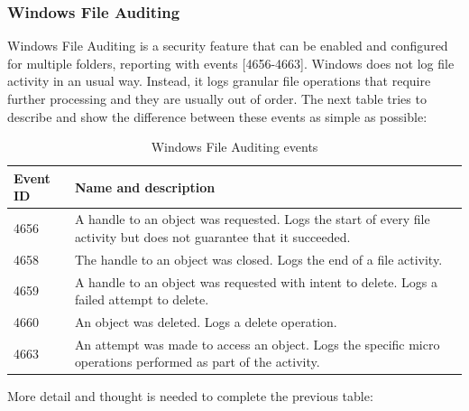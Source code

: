 \subsubsection{Windows File Auditing}
Windows File Auditing is a security feature that can be enabled and configured for multiple folders, reporting with events [4656-4663].
\linej
Windows does not log file activity in an usual way.
Instead, it logs granular file operations that require further processing and they are usually out of order.
The next table tries to describe and show the difference between these events as simple as possible\cite{windows_events}\cite{events_46_56_X}:
\begin{table}[H]
	\begin{tabularx}{\textwidth}{|l|X|}
		\hline
		\rowcolor{gray!30}
		Event ID & Name and description\\ \hline
		4656& A handle to an object was requested. Logs the start of every file activity but does not guarantee that it succeeded.\\ \hline
		4658& The handle to an object was closed. Logs the end of a file activity.\\ \hline
		4659& A handle to an object was requested with intent to delete. Logs a failed attempt to delete.\\ \hline
		4660& An object was deleted. Logs a delete operation.\\ \hline
		4663& An attempt was made to access an object. Logs the specific micro operations performed as part of the activity.\\ \hline
	\end{tabularx}
	\caption{Windows File Auditing events}
\end{table}
\linej
More detail and thought is needed to complete the previous table\cite{windows_events}\cite{events_46_56_X}:
